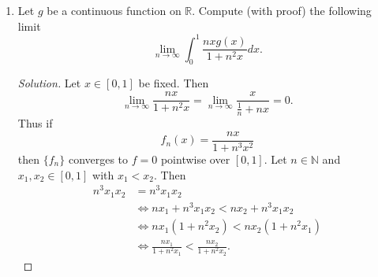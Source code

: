 \documentclass[12pt]{article}
\newenvironment{solution}
{\renewcommand\qedsymbol{$\blacksquare$}\begin{proof}[Solution]}
{\end{proof}}
\begin{document}
\begin{enumerate}
\begin{enumerate}[(a)]
\begin{solution}
                        \begin{align*}
                            \lim_{n\to\infty}f_n(x_n)&
                            =\lim_{n\to\infty}n\bigg(1-\frac{1}{n}\bigg)^n\bigg(\frac{1}{n}\bigg)
                            \\
                            &=\lim_{n\to\infty}\bigg(1-\frac{1}{n}\bigg)^n \\
                            &=\frac{1}{e}.
                        \end{align*}
                        In summary we have a sequence of continuous functions
                        $\{f_n\}$ which converge pointwise to $f=0$ and we have
                        a sequence $x_n$ which converges to $x\in[0, 1]$.
                        However, $\lim_{n\to\infty}f_n(x_n)\neq f(x)$. 
                    \end{solution}
            \end{enumerate}
        \item Let $g$ be a continuous function on $\mathbb{R}$. Compute (with
            proof) the following limit
            \begin{equation*}
                \lim_{n\to\infty}\int_{0}^{1}\frac{nxg(x)}{1+n^2x}dx.
            \end{equation*}
            \begin{solution}
                Let $x\in[0, 1]$ be fixed. Then 
                \begin{equation*}
                    \lim_{n\to\infty}\frac{nx}{1+n^2x}=\lim_{n\to\infty}\frac{x}{\frac{1}{n}+nx}
                    =0.
                \end{equation*}
                Thus if
                \begin{equation*}
                    f_n(x)=\frac{nx}{1+n^3x^2}
                \end{equation*}
                then $\{f_n\}$ converges to $f=0$ pointwise over $[0, 1]$. 
                Let $n\in\mathbb{N}$ and $x_1, x_2\in[0, 1]$ with $x_1<x_2$.
                Then 
                \begin{align*}
                    n^3x_1x_2&=n^3x_1x_2 \\
                    &\Leftrightarrow nx_1+n^3x_1x_2 < nx_2+n^3x_1x_2 \\
                    &\Leftrightarrow nx_1(1+n^2x_2)<nx_2(1+n^2x_1) \\
                    &\Leftrightarrow\frac{nx_1}{1+n^2x_1}<\frac{nx_2}{1+n^2x_2}.
                \end{align*}

\end{solution}
\end{enumerate}
\end{document}
